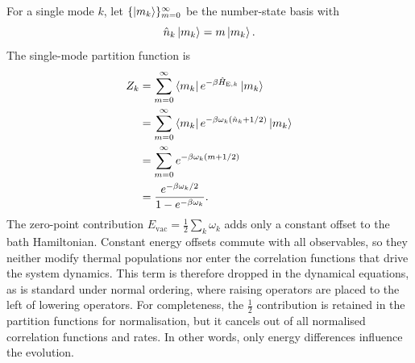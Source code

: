 For a single mode \(k\), let \(\{\ket{m_k}\}_{m=0}^{\infty}\) be the number-state basis with
\begin{equation*}
	\hat{n}_k\ket{m_k} = m\ket{m_k}.
\end{equation*}
The single-mode partition function is
\begin{align*}
	Z_k
	&=
	\sum_{m=0}^{\infty}
	\bra{m_k}e^{-\beta \hat{H}_{\mathrm{E},k}}\ket{m_k} \\
	&=
	\sum_{m=0}^{\infty}
	\bra{m_k}e^{-\beta \omega_k(\hat{n}_k+1/2)}\ket{m_k} \\
	&=
	\sum_{m=0}^{\infty}
	e^{-\beta \omega_k(m+1/2)} \\
	&=
	\frac{e^{-\beta\omega_k/2}}{1-e^{-\beta\omega_k}}.
\end{align*}
The zero-point contribution \(E_{\mathrm{vac}}=\frac{1}{2}\sum_k\omega_k\) adds only a constant offset to the bath Hamiltonian. Constant energy offsets commute with all observables, so they neither modify thermal populations nor enter the correlation functions that drive the system dynamics. This term is therefore dropped in the dynamical equations, as is standard under normal ordering, where raising operators are placed to the left of lowering operators. For completeness, the \(\tfrac{1}{2}\) contribution is retained in the partition functions for normalisation, but it cancels out of all normalised correlation functions and rates. In other words, only energy differences influence the evolution.


